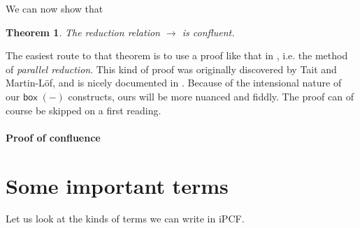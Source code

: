 \documentclass{myifcolog}
\newtheorem{thm}{Theorem}
\theoremstyle{definition}
\newcommand{\ibox}[1]{\mathsf{box\;}#1}
\newcommand{\red}{\mathrel{\longrightarrow}}
\begin{document}
We can now show that

\begin{thm}
  \label{thm:conf}
  The reduction relation $\red{}$ is confluent.
\end{thm}

The easiest route to that theorem is to use a proof like that in
\cite{Kavvos2017b}, i.e. the method of \emph{parallel reduction}.
This kind of proof was originally discovered by Tait and
Martin-L\"of, and is nicely documented in \cite{Takahashi1995}.
Because of the intensional nature of our $\ibox{(-)}$ constructs,
ours will be more nuanced and fiddly.  The proof can of course be
skipped on a first reading.

\paragraph{Proof of confluence}



\section{Some important terms}
  \label{sec:ipcfterms}

Let us look at the kinds of terms we can write in iPCF.
\end{document}
